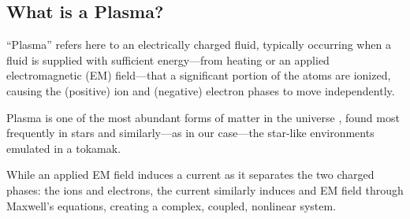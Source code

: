 \subsection*{What is a Plasma?}
    \line

    \begin{definition}[Plasma]
        ``Plasma'' refers here to an electrically charged fluid, typically occurring when a fluid is supplied with sufficient energy—from heating or an applied electromagnetic (EM) field—that a significant portion of the atoms  are ionized, causing the (positive) ion and (negative) electron phases to move independently.
    \end{definition}
    
    \line

    Plasma is one of the most abundant forms of matter in the universe \cite{CL13}, found most frequently in stars \cite{Phi95, Asc06, Pie17} and similarly—as in our case—the star-like environments emulated in a tokamak.
    
    While an applied EM field induces a current as it separates the two charged phases: the ions and electrons, the current similarly induces and EM field through Maxwell's equations, creating a complex, coupled, nonlinear system.
    \begin{center}\end{center}
    